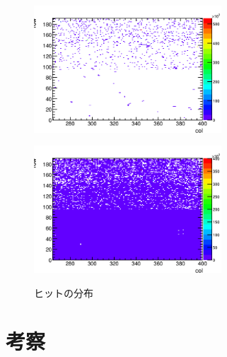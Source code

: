 \begin{figure}[h]
  \centering
  \begin{minipage}[b]{0.45\linewidth}
    \centering
    \includegraphics[width=7cm]{./figure/selftrigwo.png}
    \label{fig:extwo}
  \end{minipage}
  \begin{minipage}[b]{0.45\linewidth}
    \centering
    \includegraphics[width=7cm]{./figure/selftrigw.png}
    \label{fig:extw}
  \end{minipage}
  \caption{ヒットの分布}
  \label{fig:ext}
\end{figure}

\section{考察}
\label{sec:extsum}

